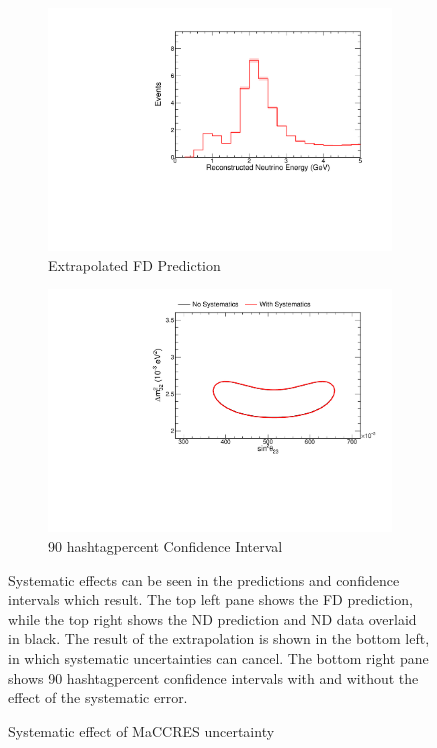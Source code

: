 {\begin{figure}
\begin{center}
\begin{subfigure}[c]{0.49\textwidth}
\includegraphics[width=\textwidth]{figures/systs/prediction/fd_extrap_prediction_MaCCRES.pdf}
\caption*{Extrapolated FD Prediction}
\end{subfigure}
\begin{subfigure}[c]{0.49\textwidth}
\includegraphics[width=\textwidth]{figures/systs/prediction/fd_extrap_contour_MaCCRES.pdf}
\caption*{90 hashtagpercent Confidence Interval}
\end{subfigure}
\end{center}
\caption{Systematic effect of MaCCRES uncertainty}{
Systematic effects can be seen in the predictions and confidence intervals
which result.
The top left pane shows the FD prediction, while the top right shows the
ND prediction and ND data overlaid in black.
The result of the extrapolation is shown in the bottom left, in which
systematic uncertainties can cancel.
The bottom right pane shows 90 hashtagpercent confidence intervals with and without
the effect of the systematic error.}
\label{syst_fig_MaCCRES}


\end{figure}}
